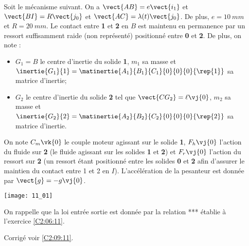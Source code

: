 \normalfalse \difficiletrue \tdifficilefalse
\correctionfalse


\setcounter{question}{0}
\ifcorrection
\else
{}
\fi

\ifprof
\else
Soit le mécanisme suivant. On a $\vect{AB}=e\vect{i_1}$ et $\vect{BI}=R\vect{j_0}$ et $\vect{AC}=\lambda(t)\vect{j_0}$. De plus, 
$e=\SI{10}{mm}$ et $R=\SI{20}{mm}$. Le contact entre \textbf{1} et \textbf{2} en $B$ est maintenu en permanence par un ressort suffisamment raide (non représenté) positionné entre \textbf{0} et \textbf{2}. De plus, on note :
\begin{itemize}
\item $G_1 = B$ le centre d'inertie du solide \textbf{1}, $m_1$ sa masse et $\inertie{G_1}{1}=\matinertie{A_1}{B_1}{C_1}{0}{0}{0}{\rep{1}}$ sa matrice d'inertie;
\item $G_2$ le centre d'inertie du solide \textbf{2} tel que $\vect{CG_2}=\ell \vj{0}$, $m_2$ sa masse et $\inertie{G_2}{2}=\matinertie{A_2}{B_2}{C_2}{0}{0}{0}{\rep{2}}$ sa matrice d'inertie.
\end{itemize}
On note $C_m\vk{0}$ le couple moteur agissant sur le solide \textbf{1}, $F_h\vj{0}$ l'action du fluide sur \textbf{2} (le fluide agissant sur les solides \textbf{1} et \textbf{2}) 
et $F_r\vj{0}$ l'action du ressort sur \textbf{2} (un ressort étant positionné entre les solides \textbf{0} et \textbf{2} afin d'assurer le maintien du contact entre 1 et 2 en $I$). L'accélération de la pesanteur est donnée par $\vect{g}=-g\vj{0}$.

\begin{center}
\texttt{[image: 11\_01]}
\end{center}
\fi

On rappelle que la loi entrée sortie est donnée par la relation *** établie à l'exercice \ref{C2:06:11}.

\ifprof
\else
\fi

\ifprof
\else
\fi

\ifprof
\else
\fi

\ifprof
\else
\fi

\ifprof
\else
\fi





\ifprof
\else
\begin{flushright}
\footnotesize{Corrigé  voir \ref{C2:09:11}.}
\end{flushright}%
\fi